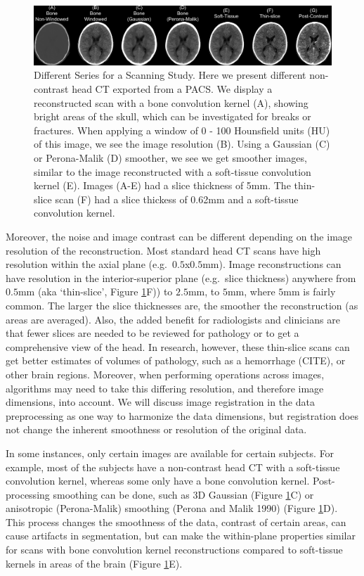 \documentclass[]{elsarticle} %
\begin{document}
\begin{figure}
\includegraphics[width=1\linewidth]{overlaid_slices} \caption{Different Series for a Scanning Study.  Here we present different non-contrast head CT exported from a PACS.  We display a reconstructed scan with a bone convolution kernel (A), showing bright areas of the skull, which can be investigated for breaks or fractures.  When applying a window of 0 - 100 Hounsfield units (HU) of this image, we see the image resolution (B).  Using a Gaussian (C) or Perona-Malik (D) smoother, we see we get smoother images, similar to the image reconstructed with a soft-tissue convolution kernel (E).  Images (A-E) had a slice thickness of 5mm.  The thin-slice scan (F) had a slice thickess of 0.62mm and a soft-tissue convolution kernel.}\label{fig:overlay}
\end{figure}

Moreover, the noise and image contrast can be different depending on the image resolution of the reconstruction. Most standard head CT scans have high resolution within the axial plane (e.g.~\(0.5\)x\(0.5\)mm). Image reconstructions can have resolution in the interior-superior plane (e.g.~slice thickness) anywhere from \(0.5\)mm (aka `thin-slice', Figure \ref{fig:overlay}F)) to \(2.5\)mm, to \(5\)mm, where \(5\)mm is fairly common. The larger the slice thicknesses are, the smoother the reconstruction (as areas are averaged). Also, the added benefit for radiologists and clinicians are that fewer slices are needed to be reviewed for pathology or to get a comprehensive view of the head. In research, however, these thin-slice scans can get better estimates of volumes of pathology, such as a hemorrhage (CITE), or other brain regions. Moreover, when performing operations across images, algorithms may need to take this differing resolution, and therefore image dimensions, into account. We will discuss image registration in the data preprocessing as one way to harmonize the data dimensions, but registration does not change the inherent smoothness or resolution of the original data.

In some instances, only certain images are available for certain subjects. For example, most of the subjects have a non-contrast head CT with a soft-tissue convolution kernel, whereas some only have a bone convolution kernel. Post-processing smoothing can be done, such as 3D Gaussian (Figure \ref{fig:overlay}C) or anisotropic (Perona-Malik) smoothing (Perona and Malik 1990) (Figure \ref{fig:overlay}D). This process changes the smoothness of the data, contrast of certain areas, can cause artifacts in segmentation, but can make the within-plane properties similar for scans with bone convolution kernel reconstructions compared to soft-tissue kernels in areas of the brain (Figure \ref{fig:overlay}E).
\end{document}

